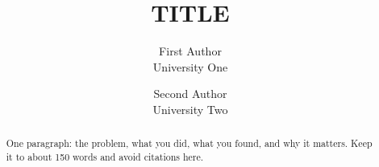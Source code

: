 \documentclass[letterpaper,twocolumn,10pt]{article}
\begin{document}
\date{}
\title{\Large \bf {{TITLE}}}

\author{
{\rm First Author}\\
University One
\and
{\rm Second Author}\\
University Two
}

\maketitle

\begin{abstract}
One paragraph: the problem, what you did, what you found, and why it matters. Keep it to about 150 words and avoid citations here.
\end{abstract}






\end{document}
